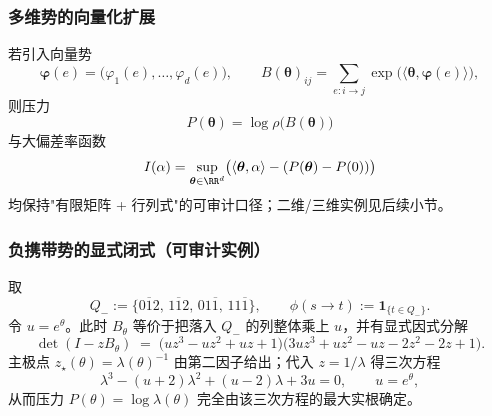 \subsubsection{多维势的向量化扩展}\label{app:vector-potential}
若引入向量势
\[
\boldsymbol{\varphi}(e)=\bigl(\varphi_1(e),\dots,\varphi_d(e)\bigr),
\qquad
B(\boldsymbol{\theta})_{ij}=\sum_{e:i\to j}\exp\!\bigl(\langle\boldsymbol{\theta},\boldsymbol{\varphi}(e)\rangle\bigr),
\]
则压力
\[
P(\boldsymbol{\theta})=\log\rho\bigl(B(\boldsymbol{\theta})\bigr)
\]
与大偏差率函数
\[
I(\alpha)=\sup_{\boldsymbol{\theta}\in\RR^d}\bigl(\langle\boldsymbol{\theta},\alpha\rangle-(P(\boldsymbol{\theta})-P(0))\bigr)
\]
均保持"有限矩阵 + 行列式"的可审计口径；二维/三维实例见后续小节。

\subsubsection{负携带势的显式闭式（可审计实例）}
取
\[
Q_-:=\{0\overline{1}2,\,1\overline{1}2,\,01\overline{1},\,11\overline{1}\},
\qquad
\phi(s\to t):=\mathbf{1}_{\{t\in Q_-\}}.
\]
令 $u=e^\theta$。此时 $B_\theta$ 等价于把落入 $Q_-$ 的列整体乘上 $u$，并有显式因式分解
\[
\det(I-zB_\theta)
\;=\;
\bigl(u z^3-u z^2+u z+1\bigr)\bigl(3u z^3+u z^2-u z-2z^2-2z+1\bigr).
\]
主极点 $z_\star(\theta)=\lambda(\theta)^{-1}$ 由第二因子给出；代入 $z=1/\lambda$ 得三次方程
\[
\lambda^3-(u+2)\lambda^2+(u-2)\lambda+3u=0,\qquad u=e^\theta,
\]
从而压力 $P(\theta)=\log\lambda(\theta)$ 完全由该三次方程的最大实根确定。

